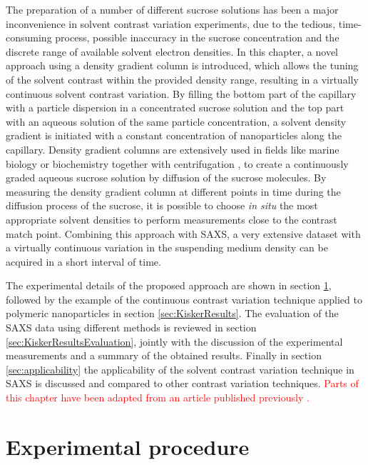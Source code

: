 The preparation of a number of different sucrose solutions has been a major inconvenience in solvent contrast variation experiments, due to the tedious, time-consuming process, possible inaccuracy in the sucrose concentration and the discrete range of available solvent electron densities. In this chapter, a novel approach using a density gradient column is introduced, which allows the tuning of the solvent contrast within the provided density range, resulting in a virtually continuous solvent contrast variation. By filling the bottom part of the capillary with a particle dispersion in a concentrated sucrose solution and the top part with an aqueous solution of the same particle concentration, a solvent density gradient is initiated with a constant concentration of nanoparticles along the capillary. Density gradient columns are extensively used in fields like marine biology \citep{coombs_density-gradient_1981} or biochemistry together with centrifugation \citep{hinton_density_1978}, to create a continuously graded aqueous sucrose solution by diffusion of the sucrose molecules. By measuring the density gradient column at different points in time during the diffusion process of the sucrose, it is possible to choose \emph{in situ} the most appropriate solvent densities to perform measurements close to the contrast match point. Combining this approach with SAXS, a very extensive dataset with a virtually continuous variation in the suspending medium density can be acquired in a short interval of time.

The experimental details of the proposed approach are shown in section \ref{sec:DensityGradientExperimental}, followed by the example of the continuous contrast variation technique applied to polymeric nanoparticles in section \ref{sec:KiskerResults}. The evaluation of the SAXS data using different methods is reviewed in section \ref{sec:KiskerResultsEvaluation}, jointly with the discussion of the experimental measurements and a summary of the obtained results. Finally in section \ref{sec:applicability} the applicability of the solvent contrast variation technique in SAXS is discussed and compared to other contrast variation techniques. \textcolor{red}{Parts of this chapter have been adapted from an article published previously \citep{garcia-diez_nanoparticle_2015}.}


\section{Experimental procedure}
\label{sec:DensityGradientExperimental}


